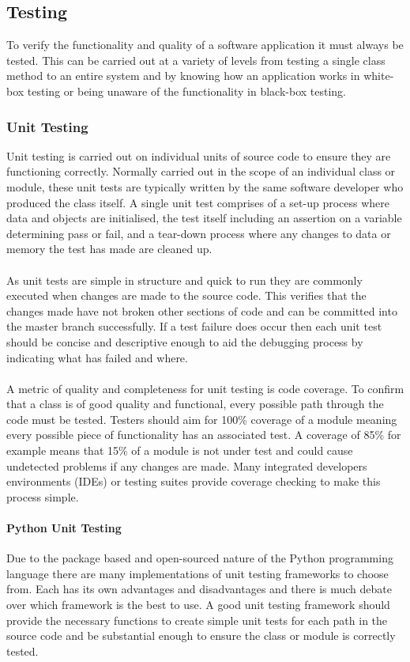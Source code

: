 \subsection{Testing}
	To verify the functionality and quality of a software application it must always be tested. This can be carried out at a variety of levels from testing a single class method to an entire system and by knowing how an application works in white-box testing or being unaware of the functionality in black-box testing.
	\subsubsection{Unit Testing}
		Unit testing is carried out on individual units of source code to ensure they are functioning correctly. Normally carried out in the scope of an individual class or module, these unit tests are typically written by the same software developer who produced the class itself. A single unit test comprises of a set-up process where data and objects are initialised, the test itself including an assertion on a variable determining pass or fail, and a tear-down process where any changes to data or memory the test has made are cleaned up.
		\\\\
		As unit tests are simple in structure and quick to run they are commonly executed when changes are made to the source code. This verifies that the changes made have not broken other sections of code and can be committed into the master branch successfully. If a test failure does occur then each unit test should be concise and descriptive enough to aid the debugging process by indicating what has failed and where.
		\\\\
		A metric of quality and completeness for unit testing is code coverage. To confirm that a class is of good quality and functional, every possible path through the code must be tested. Testers should aim for 100\% coverage of a module meaning every possible piece of functionality has an associated test. A coverage of 85\% for example means that 15\% of a module is not under test and could cause undetected problems if any changes are made. Many integrated developers environments (IDEs) or testing suites provide coverage checking to make this process simple.
		\paragraph{Python Unit Testing}
			Due to the package based and open-sourced nature of the Python programming language there are many implementations of unit testing frameworks to choose from. Each has its own advantages and disadvantages and there is much debate over which framework is the best to use. A good unit testing framework should provide the necessary functions to create simple unit tests for each path in the source code and be substantial enough to ensure the class or module is correctly tested.
